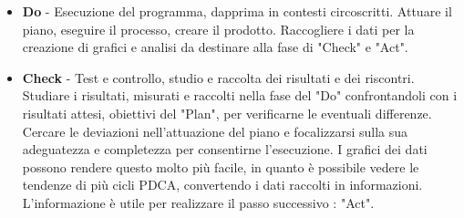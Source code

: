 {\begin{itemize}

  \item  \textbf{Do} -  Esecuzione del programma, dapprima in contesti
    circoscritti. Attuare il piano, eseguire il processo, creare il
    prodotto. Raccogliere i dati per la creazione di grafici e analisi
    da destinare alla fase di "Check" e "Act". 

  \item  \textbf{Check} - Test e controllo, studio e raccolta dei
    risultati e dei riscontri. Studiare i risultati, misurati e
    raccolti nella fase del "Do" confrontandoli con i risultati
    attesi, obiettivi del "Plan", per verificarne le eventuali
    differenze. Cercare le deviazioni nell'attuazione del piano e
    focalizzarsi sulla sua adeguatezza e completezza per consentirne
    l'esecuzione. I grafici dei dati possono rendere questo molto più
    facile, in quanto è possibile vedere le tendenze di più cicli
    PDCA, convertendo i dati raccolti in informazioni. L'informazione
    è utile per realizzare il passo successivo : "Act".


\end{itemize}}
